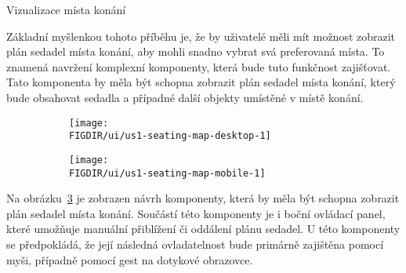 \begin{subsection}{Vizualizace místa konání}
    \label{subsec:narvh-ui-transformace-uzivatelskych-pribehu-vizualizace-mista-konani}
    \userstoryvenuemap

    Základní myšlenkou tohoto příběhu je, že by uživatelé měli mít možnost zobrazit plán sedadel místa konání, aby mohli snadno vybrat svá preferovaná místa.
    To znamená navržení komplexní komponenty, která bude tuto funkčnost zajišťovat.
    Tato komponenta by měla být schopna zobrazit plán sedadel místa konání, který bude obsahovat sedadla a případné další objekty umístěné v místě konání.

    \begin{figure}[H]
        \centering
        \caption{Návrh komponent pro vizualizaci plánu sedadel místa konání}
        \begin{subfigure}{0.775\textwidth}
            \texttt{[image: \\FIGDIR/ui/us1-seating-map-desktop-1]}
            \label{fig:us1-seating-map-desktop-1}
        \end{subfigure}
        \begin{subfigure}{0.2\textwidth}
            \texttt{[image: \\FIGDIR/ui/us1-seating-map-mobile-1]}
            \label{fig:us1-seating-map-mobile-1}
        \end{subfigure}
        \source
        \label{fig:us1-seating-map}
    \end{figure}

    Na obrázku~\ref{fig:us1-seating-map} je zobrazen návrh komponenty, která by měla být schopna zobrazit plán sedadel místa konání.
    Součástí této komponenty je i boční ovládací panel, které umožňuje manuální přiblížení či oddálení plánu sedadel.
    U této komponenty se předpokládá, že její následná ovladatelnost bude primárně zajištěna pomocí myši, případně pomocí gest na dotykové obrazovce.

\end{subsection}

